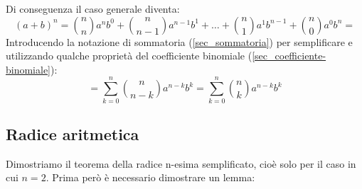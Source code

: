 Di conseguenza il caso generale diventa:
\begin{equation*}
    (a+b)^n = \binom{n}{n} a^n b^0 + \binom{n}{n-1} a^{n-1} b^1 + \dots + \binom{n}{1} a^1b^{n-1} + \binom{n}{0} a^0b^n = 
\end{equation*}
Introducendo la notazione di sommatoria (\ref{sec_sommatoria}) per semplificare e utilizzando qualche proprietà del coefficiente binomiale (\ref{sec_coefficiente-binomiale}):
\begin{equation*}
    = \sum \limits_{k = 0}^{n} \binom{n}{n-k} a^{n-k}b^k = \sum \limits_{k = 0}^{n} \binom{n}{k} a^{n-k}b^k
\end{equation*}



\subsection{Radice aritmetica} \label{sec_radiceAritmetica}
Dimostriamo il teorema della radice n-esima semplificato, cioè solo per il caso in cui $n = 2$. Prima però è necessario dimostrare un lemma:

    
